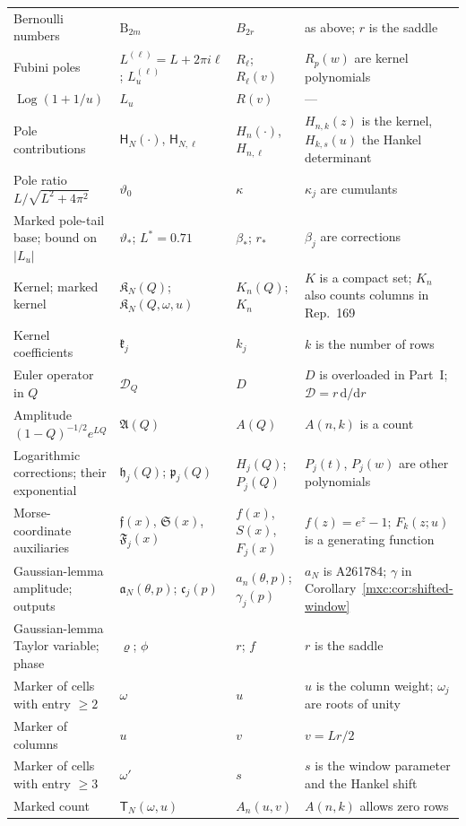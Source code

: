 \documentclass[11pt]{article}
\numberwithin{equation}{section}
\theoremstyle{definition}
\theoremstyle{remark}
\begin{document}
{\begin{longtable}{@{}>{\raggedright\arraybackslash}p{}>{\raggedright\arraybackslash}p{}>{\raggedright\arraybackslash}p{}>{\raggedright\arraybackslash}p{}@{}}
Bernoulli numbers & $\mathrm B_{2m}$ & $B_{2r}$ & as above; $r$ is the saddle\\
Fubini poles & $L^{(\ell)}=L+2\pi i\ell$; $L_u^{(\ell)}$ & $R_\ell$; $R_\ell(v)$ & $R_p(w)$ are kernel polynomials\\
$\operatorname{Log}(1+1/u)$ & $L_u$ & $R(v)$ & ---\\
Pole contributions & $\mathsf H_N(\cdot)$, $\mathsf H_{N,\ell}$ & $H_n(\cdot)$, $H_{n,\ell}$ & $H_{n,k}(z)$ is the kernel, $H_{k,s}(u)$ the Hankel determinant\\
Pole ratio $L/\sqrt{L^2+4\pi^2}$ & $\vartheta_0$ & $\kappa$ & $\kappa_j$ are cumulants\\
Marked pole-tail base; bound on $|L_u|$ & $\vartheta_*$; $L^*=0.71$ & $\beta_*$; $r_*$ & $\beta_j$ are corrections\\
Kernel; marked kernel & $\mathfrak K_N(Q)$; $\mathfrak K_N(Q,\omega,u)$ & $K_n(Q)$; $K_n$ & $K$ is a compact set; $K_n$ also counts columns in Rep.~169\\
Kernel coefficients & $\mathfrak k_j$ & $k_j$ & $k$ is the number of rows\\
Euler operator in $Q$ & $\mathcal D_Q$ & $D$ & $D$ is overloaded in Part~I; $\mathcal D=r\,\mathrm d/\mathrm dr$\\
Amplitude $(1-Q)^{-1/2}e^{LQ}$ & $\mathfrak A(Q)$ & $A(Q)$ & $A(n,k)$ is a count\\
Logarithmic corrections; their exponential & $\mathfrak h_j(Q)$; $\mathfrak p_j(Q)$ & $H_j(Q)$; $P_j(Q)$ & $P_j(t)$, $P_j(w)$ are other polynomials\\
Morse-coordinate auxiliaries & $\mathfrak f(x)$, $\mathfrak S(x)$, $\mathfrak F_j(x)$ & $f(x)$, $S(x)$, $F_j(x)$ & $f(z)=e^z-1$; $F_k(z;u)$ is a generating function\\
Gaussian-lemma amplitude; outputs & $\mathfrak a_N(\theta,p)$; $\mathfrak c_j(p)$ & $a_n(\theta,p)$; $\gamma_j(p)$ & $a_N$ is A261784; $\gamma$ in Corollary~\ref{mxc:cor:shifted-window}\\
Gaussian-lemma Taylor variable; phase & $\varrho$; $\phi$ & $r$; $f$ & $r$ is the saddle\\
Marker of cells with entry $\ge2$ & $\omega$ & $u$ & $u$ is the column weight; $\omega_j$ are roots of unity\\
Marker of columns & $u$ & $v$ & $v=Lr/2$\\
Marker of cells with entry $\ge3$ & $\omega'$ & $s$ & $s$ is the window parameter and the Hankel shift\\
Marked count & $\mathsf T_N(\omega,u)$ & $A_n(u,v)$ & $A(n,k)$ allows zero rows\\

\end{longtable}}
\end{document}

